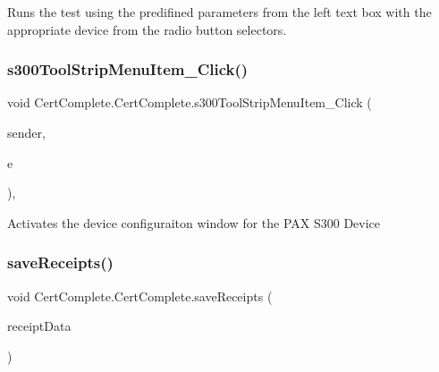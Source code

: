 Runs the test using the predifined parameters from the left text box with the appropriate device from the radio button selectors. 

\mbox{\label{class_cert_complete_1_1_cert_complete_a111983d372181505a83c4c05fd2927db}} 
\subsubsection{\texorpdfstring{s300\+Tool\+Strip\+Menu\+Item\+\_\+\+Click()}{s300ToolStripMenuItem\_Click()}}
{\footnotesize\ttfamily void Cert\+Complete.\+Cert\+Complete.\+s300\+Tool\+Strip\+Menu\+Item\+\_\+\+Click (\begin{DoxyParamCaption}\item[{object}]{sender,  }\item[{Event\+Args}]{e }\end{DoxyParamCaption})\hspace{0.3cm}{\ttfamily [inline]}, {\ttfamily [private]}}



Activates the device configuraiton window for the P\+AX S300 Device 

\mbox{\label{class_cert_complete_1_1_cert_complete_a99edec1e7fba6c4e77fdbff75eb449d1}} 
\subsubsection{\texorpdfstring{save\+Receipts()}{saveReceipts()}\hspace{0.1cm}{\footnotesize\ttfamily [1/2]}}
{\footnotesize\ttfamily void Cert\+Complete.\+Cert\+Complete.\+save\+Receipts (\begin{DoxyParamCaption}\item[{string}]{receipt\+Data }\end{DoxyParamCaption})\hspace{0.3cm}{\ttfamily [inline]}}




